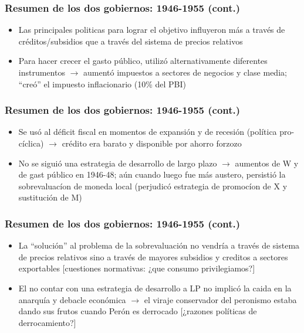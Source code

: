 \documentclass[14pt,aspectratio=169]{beamer}
\begin{document}
                \begin{frame}\frametitle{Resumen de los dos gobiernos:
                    1946-1955 (cont.)}
  \begin{itemize}\itemsep 10pt
      \item Las principales politicas para lograr el objetivo
        influyeron más a través de créditos/subsidios que a través del
        sistema de precios relativos
        \item Para hacer crecer el gasto público, utilizó
          alternativamente diferentes instrumentos $\longrightarrow$
          aumentó impuestos a sectores de negocios y clase media; ``creó''
          el impuesto inflacionario (10\% del PBI)
                 \end{itemize}
               \end{frame}


 \begin{frame}\frametitle{Resumen de los dos gobiernos:
                    1946-1955 (cont.)}
  \begin{itemize}\itemsep 10pt
      \item Se usó al déficit fiscal en momentos de expansión y de
        recesión (política pro-cíclica) $\longrightarrow$ crédito era
        barato y disponible por ahorro forzozo
        \item No se siguió una estrategia de desarrollo de largo plazo
          $\longrightarrow$ aumentos de W y de gast público en
          1946-48; aún cuando luego fue más austero, persistió la
          sobrevaluacíon de moneda local (perjudicó estrategia de
          promocíon de X y sustitución de M)
                 \end{itemize}
               \end{frame}


\begin{frame}\frametitle{Resumen de los dos gobiernos:
                    1946-1955 (cont.)}
  \begin{itemize}\itemsep 10pt
      \item La ``solución'' al problema de la sobrevaluación no
        vendría a través de sistema de precios relativos sino a través
        de mayores subsidios y creditos a sectores exportables
        [cuestiones normativas: ¿que consumo privilegiamos?]
                \item El no contar con una estrategia de desarrollo a
                  LP no implicó la caida en la anarquía y debacle
                  económica $\longrightarrow$ el viraje conservador
                  del peronismo estaba dando sus frutos cuando Perón
                  es derrocado [¿razones políticas de derrocamiento?]
                 \end{itemize}
               \end{frame}
               
               
               
                 
\end{document}

